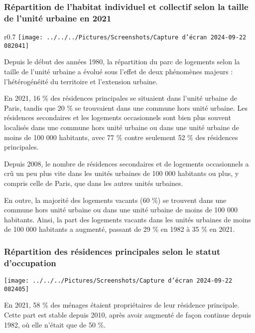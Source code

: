 \documentclass[a4paper, 12pt]{report}
\begin{document}
\subsubsection{Répartition de l'habitat individuel et collectif selon la taille de l’unité urbaine en 2021}

\begin{wrapfigure}{r}{0.7\textwidth}
	\centering
\texttt{[image: ../../../Pictures/Screenshots/Capture d'écran 2024-09-22 082041]}
\end{wrapfigure}

Depuis le début des années 1980, la répartition du parc de logements selon la taille de l’unité urbaine a évolué sous l’effet de deux phénomènes majeurs : l’hétérogénéité du territoire et l’extension urbaine. 

En 2021, 16 \% des résidences principales se situaient dans l’unité urbaine de Paris, tandis que 20 \% se trouvaient dans une commune hors unité urbaine. Les résidences secondaires et les logements occasionnels sont bien plus souvent localisés dans une commune hors unité urbaine ou dans une unité urbaine de moins de 100 000 habitants, avec 77 \% contre seulement 52 \% des résidences principales. 

Depuis 2008, le nombre de résidences secondaires et de logements occasionnels a crû un peu plus vite dans les unités urbaines de 100 000 habitants ou plus, y compris celle de Paris, que dans les autres unités urbaines. 

En outre, la majorité des logements vacants (60 \%) se trouvent dans une commune hors unité urbaine ou dans une unité urbaine de moins de 100 000 habitants. Ainsi, la part des logements vacants dans les unités urbaines de moins de 100 000 habitants a augmenté, passant de 29 \% en 1982 à 35 \% en 2021.
\subsubsection{Répartition des résidences principales selon le statut d'occupation}

\begin{center}
	\texttt{[image: ../../../Pictures/Screenshots/Capture d'écran 2024-09-22 082405]}
\end{center}

En 2021, 58 \% des ménages étaient propriétaires de leur résidence principale. Cette part est stable depuis 2010, après avoir augmenté de façon continue depuis 1982, où elle n'était que de 50 \%. 
\end{document}
